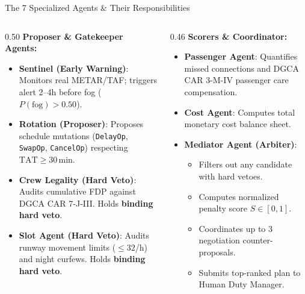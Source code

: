 \documentclass[aspectratio=169,10pt]{beamer}
\begin{document}
\begin{frame}{The 7 Specialized Agents \& Their Responsibilities}
  \begin{columns}[t]
    \begin{column}{0.50\textwidth}
      \textbf{Proposer \& Gatekeeper Agents:}
      \begin{itemize}\footnotesize
        \item \textbf{Sentinel (Early Warning)}: Monitors real METAR/TAF; triggers alert 2--4h before fog ($P(\text{fog}) > 0.50$).
        \item \textbf{Rotation (Proposer)}: Proposes schedule mutations (\texttt{DelayOp}, \texttt{SwapOp}, \texttt{CancelOp}) respecting $\text{TAT} \ge 30\,$min.
        \item \textbf{Crew Legality (Hard Veto)}: Audits cumulative FDP against DGCA CAR 7-J-III. Holds \textbf{binding hard veto}.
        \item \textbf{Slot Agent (Hard Veto)}: Audits runway movement limits ($\le 32$/h) and night curfews. Holds \textbf{binding hard veto}.
      \end{itemize}
    \end{column}
    \begin{column}{0.46\textwidth}
      \textbf{Scorers \& Coordinator:}
      \begin{itemize}\footnotesize
        \item \textbf{Passenger Agent}: Quantifies missed connections and DGCA CAR 3-M-IV passenger care compensation.
        \item \textbf{Cost Agent}: Computes total monetary cost balance sheet.
        \item \textbf{Mediator Agent (Arbiter)}:
        \begin{itemize}\scriptsize
          \item Filters out any candidate with hard vetoes.
          \item Computes normalized penalty score $S \in [0, 1]$.
          \item Coordinates up to 3 negotiation counter-proposals.
          \item Submits top-ranked plan to Human Duty Manager.
        \end{itemize}
      \end{itemize}
    \end{column}
  \end{columns}
\end{frame}
\end{document}

